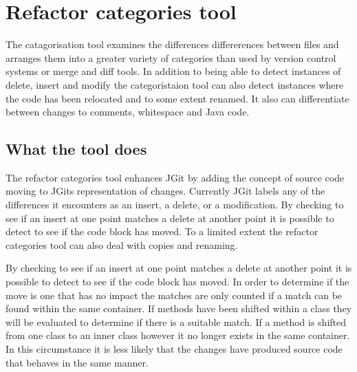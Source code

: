 
\chapter{Refactor categories tool}

The catagorisation tool examines the differences differerences between files and arranges them into a greater variety of categories than used by version control systems or merge and diff tools.  In addition to being able to detect instances of delete, insert and modify the categoristaion tool can also detect instances where the code has been relocated and to some extent renamed.  It also can differentiate between changes to comments, whitespace and Java code.

\section{What the tool does}
The refactor categories tool enhances JGit by adding the concept of source code moving to JGits representation of changes.
Currently JGit labels any of the differences it encounters as an insert, a delete, or a modification.  By checking to see if an insert at one point matches a delete at another point it is possible to detect to see if the code block has moved.
To a limited extent the refactor categories tool can also deal with copies and renaming.

By checking to see if an insert at one point matches a delete at another point it is possible to detect to see if the code block has moved. In order to determine if the move is one that has no impact the matches are only counted if a match can be found within the same container.  If methods have been shifted within a class they will be evaluated to determine if there is a suitable match.  If a method is shifted from one class to an inner class however it no longer exists in the same container.  In this circumstance it is less likely that the changes have produced source code that behaves in the same manner.

